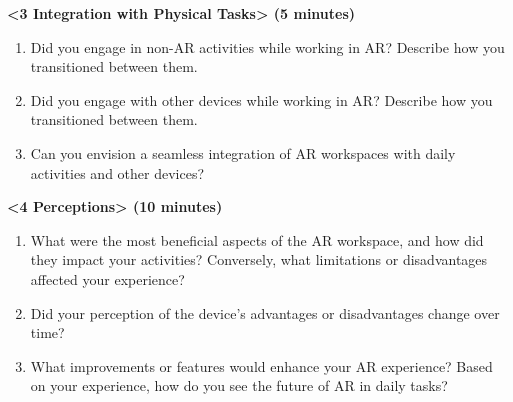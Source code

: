 \textbf{<3 Integration with Physical Tasks> (5 minutes)}

\begin{enumerate}[label=(\arabic*)]
\item
Did you engage in non-AR activities while working in AR? Describe how you transitioned between them.

\item
Did you engage with other devices while working in AR? Describe how you transitioned between them.

\item
Can you envision a seamless integration of AR workspaces with daily activities and other devices?

\end{enumerate}

\textbf{<4 Perceptions> (10 minutes)}

\begin{enumerate}[label=(\arabic*)]

\item What were the most beneficial aspects of the AR workspace, and how did they impact your activities? Conversely, what limitations or disadvantages affected your experience?

\item Did your perception of the device's advantages or disadvantages change over time?

\item What improvements or features would enhance your AR experience? Based on your experience, how do you see the future of AR in daily tasks?
\end{enumerate}
